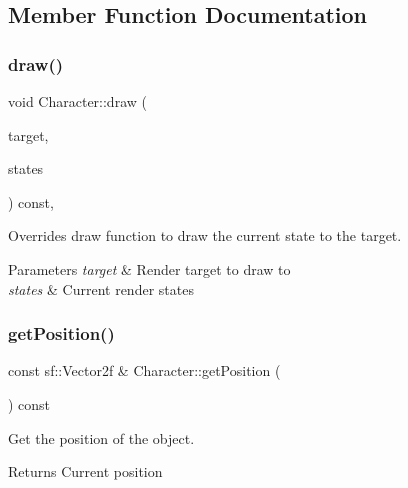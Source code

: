 \subsection{Member Function Documentation}
\mbox{\label{class_character_a3812c72bf1cf8090f67a3387b5d96753}} 
\subsubsection{\texorpdfstring{draw()}{draw()}}
{\footnotesize\ttfamily void Character\+::draw (\begin{DoxyParamCaption}\item[{sf\+::\+Render\+Target \&}]{target,  }\item[{sf\+::\+Render\+States}]{states }\end{DoxyParamCaption}) const\hspace{0.3cm}{\ttfamily [protected]}, {\ttfamily [virtual]}}



Overrides draw function to draw the current state to the target. 


\begin{DoxyParams}{Parameters}
{\em target} & Render target to draw to \\
\hline
{\em states} & Current render states \\
\hline
\end{DoxyParams}
\mbox{\label{class_character_aa07e2cfa12d28c14a1843455df396ee6}} 
\subsubsection{\texorpdfstring{get\+Position()}{getPosition()}}
{\footnotesize\ttfamily const sf\+::\+Vector2f \& Character\+::get\+Position (\begin{DoxyParamCaption}{ }\end{DoxyParamCaption}) const}



Get the position of the object. 

\begin{DoxyReturn}{Returns}
Current position 
\end{DoxyReturn}
\mbox{\label{class_character_aeeced2dfcc027de98e223b4561760fa5}} 
